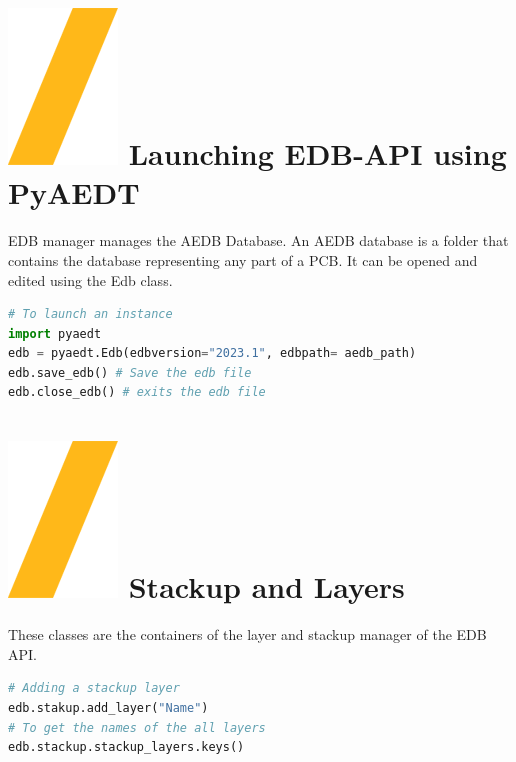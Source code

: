 \documentclass[landscape]{article}
\begin{document}
\begin{multicols}{3}
\setlength{\premulticols}{1pt}
\setlength{\postmulticols}{1pt}
\setlength{\multicolsep}{1pt}
\setlength{\columnsep}{2pt}

\section{\includegraphics[height=\fontcharht\font`\S]{slash.png} Launching EDB-API using PyAEDT}
\justifying
EDB manager manages the AEDB Database. An AEDB database is a folder that contains the database representing any part of a PCB. It can be opened and edited using the Edb class.
\begin{lstlisting}[language=Python]
# To launch an instance
import pyaedt
edb = pyaedt.Edb(edbversion="2023.1", edbpath= aedb_path)
edb.save_edb() # Save the edb file
edb.close_edb() # exits the edb file
\end{lstlisting}

\section{\includegraphics[height=\fontcharht\font`\S]{slash.png} Stackup and Layers}
These classes are the containers of the layer and stackup manager of the EDB API.
\begin{lstlisting}[language=Python]
# Adding a stackup layer
edb.stakup.add_layer("Name")
# To get the names of the all layers
edb.stackup.stackup_layers.keys()
\end{lstlisting}

\end{multicols}
\end{document}
